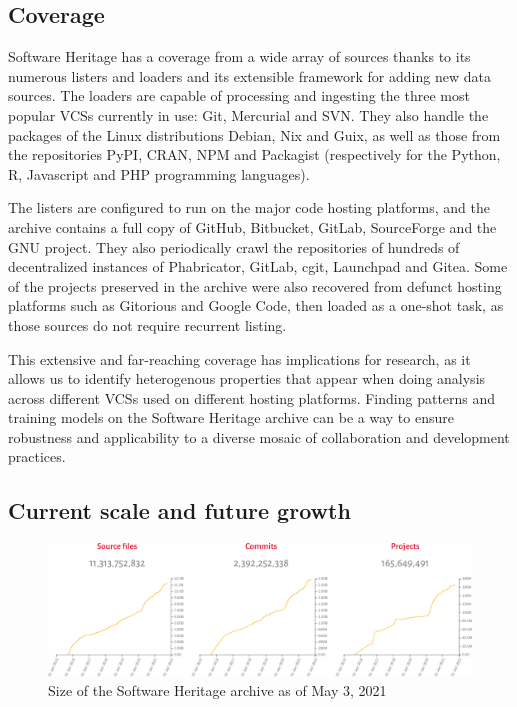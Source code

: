 \subsection{Coverage}

Software Heritage has a coverage from a wide array of sources thanks to its
numerous listers and loaders and its extensible framework for adding new data
sources. The loaders are capable of processing and ingesting the three most
popular \glspl{VCS} currently in use: Git, Mercurial and SVN\@. They also handle
the packages of the Linux distributions Debian, Nix and Guix, as well as those
from the repositories PyPI, CRAN, NPM and Packagist (respectively for the
Python, R, Javascript and PHP programming languages).

The listers are configured to run on the major code hosting platforms, and the
archive contains a full copy of GitHub, Bitbucket, GitLab, SourceForge and the
GNU project. They also periodically crawl the repositories of hundreds of
decentralized instances of Phabricator, GitLab, cgit, Launchpad and Gitea.
Some of the projects preserved in the archive were also recovered from defunct
hosting platforms such as Gitorious and Google Code, then loaded as a one-shot
task, as those sources do not require recurrent listing.


This extensive and far-reaching coverage has implications for research, as it
allows us to identify heterogenous properties that appear when doing analysis
across different \glspl{VCS} used on different hosting platforms. Finding
patterns and training models on the Software Heritage archive can be a way to
ensure robustness and applicability to a diverse mosaic of collaboration and
development practices.

\subsection{Current scale and future growth}

\begin{figure}
    \centering
    \includegraphics[width=0.9\linewidth]{../img/swh-size}
    \caption{Size of the Software Heritage archive as of May 3, 2021}%
    \label{fig:swh-size}
\end{figure}

